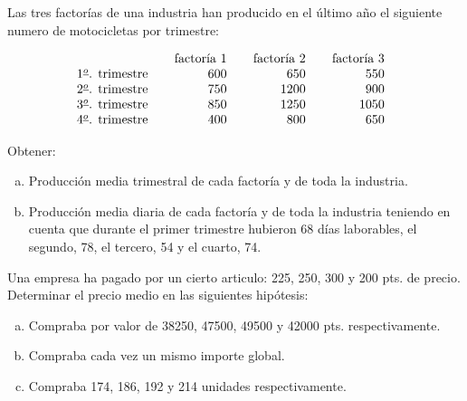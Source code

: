 \documentclass[12pt]{article}
\begin{document}
\begin{prob}Las tres factorías de una industria han producido en
el último año el siguiente  numero de motocicletas por trimestre:

$$
\vbox{\halign{\offinterlineskip\strut\hskip0.25cm # \hskip0.25cm& \hskip0.25cm\hfill #
\hskip0.25cm&\hskip0.25cm\hfill # \hskip0.25cm& \hskip0.25cm\hfill # \hskip0.25cm\cr &
factoría 1 & factoría 2 & factoría 3 \cr $1^{\underline{o}}$. trimestre & 600 & 650  &
550  \cr $2^{\underline{o}}$. trimestre & 750 & 1200 & 900 \cr $3^{\underline{o}}$.
trimestre & 850 &1250 & 1050 \cr $4^{\underline{o}}$. trimestre & 400 & 800 & 650 \cr }}
$$

Obtener:
\begin{enumerate}[a)]
\item{Producción media trimestral de cada factoría y de toda la
industria.}
\item{Producción media diaria de cada factoría y de toda la
industria teniendo  en cuenta que durante el primer trimestre hubieron  68 días
laborables, el segundo, 78, el tercero, 54 y el cuarto, 74.}
\end{enumerate}
\end{prob}

\begin{prob}Una empresa ha pagado por un cierto articulo: 225, 250,
300 y 200 pts. de precio. Determinar el precio medio  en las siguientes hipótesis:
\begin{enumerate}[a)]
\item {Compraba por valor de 38250, 47500, 49500 y 42000 pts.
respectivamente.}
\item {Compraba cada vez un mismo importe global.}
\item {Compraba 174, 186, 192 y 214 unidades respectivamente.}
\end{enumerate}
\end{prob}
\end{document}
